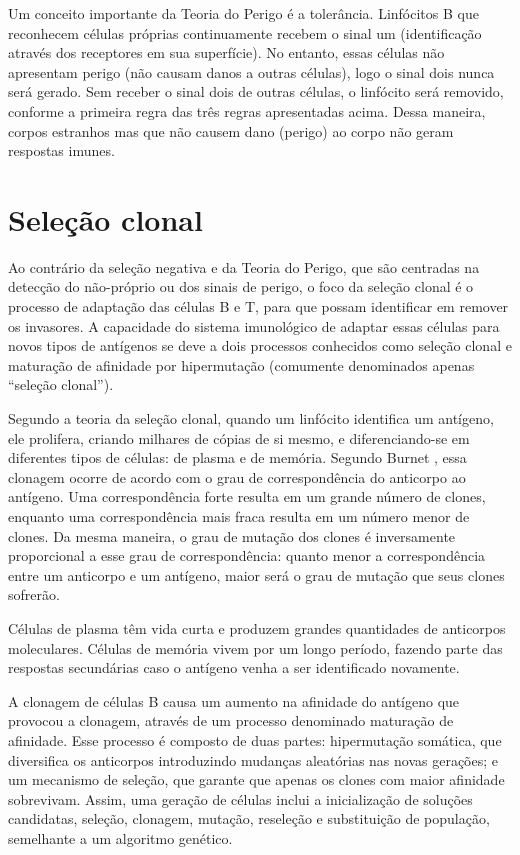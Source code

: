 Um conceito importante da Teoria do Perigo é a tolerância. Linfócitos B que reconhecem células próprias continuamente recebem o sinal um (identificação através dos receptores em sua superfície). No entanto, essas células não apresentam perigo (não causam danos a outras células), logo o sinal dois nunca será gerado. Sem receber o sinal dois de outras células, o linfócito será removido, conforme a primeira regra das três regras apresentadas acima. Dessa maneira, corpos estranhos mas que não causem dano (perigo) ao corpo não geram respostas imunes.

\section{Seleção clonal}

Ao contrário da seleção negativa e da Teoria do Perigo, que são centradas na detecção do não-próprio ou dos sinais de perigo, o foco da seleção clonal é o processo de adaptação das células B e T, para que possam identificar em remover os invasores. A capacidade do sistema imunológico de adaptar essas células para novos tipos de antígenos se deve a dois processos conhecidos como seleção clonal e maturação de afinidade por hipermutação (comumente denominados apenas ``seleção clonal'').

Segundo a teoria da seleção clonal, quando um linfócito identifica um antígeno, ele prolifera, criando milhares de cópias de si mesmo, e diferenciando-se em diferentes tipos de células: de plasma e de memória. Segundo Burnet \cite{Burnet1959}, essa clonagem ocorre de acordo com o grau de correspondência do anticorpo ao antígeno. Uma correspondência forte resulta em um grande número de clones, enquanto uma correspondência mais fraca resulta em um número menor de clones. Da mesma maneira, o grau de mutação dos clones é inversamente proporcional a esse grau de correspondência: quanto menor a correspondência entre um anticorpo e um antígeno, maior será o grau de mutação que seus clones sofrerão.

Células de plasma têm vida curta e produzem grandes quantidades de anticorpos moleculares. Células de memória vivem por um longo período, fazendo parte das respostas secundárias caso o antígeno venha a ser identificado novamente.

A clonagem de células B causa um aumento na afinidade do antígeno que provocou a clonagem, através de um processo denominado maturação de afinidade. Esse processo é composto de duas partes: hipermutação somática, que diversifica os anticorpos introduzindo mudanças aleatórias nas novas gerações; e um mecanismo de seleção, que garante que apenas os clones com maior afinidade sobrevivam. Assim, uma geração de células inclui a inicialização de soluções candidatas, seleção, clonagem, mutação, reseleção e substituição de população, semelhante a um algoritmo genético.


